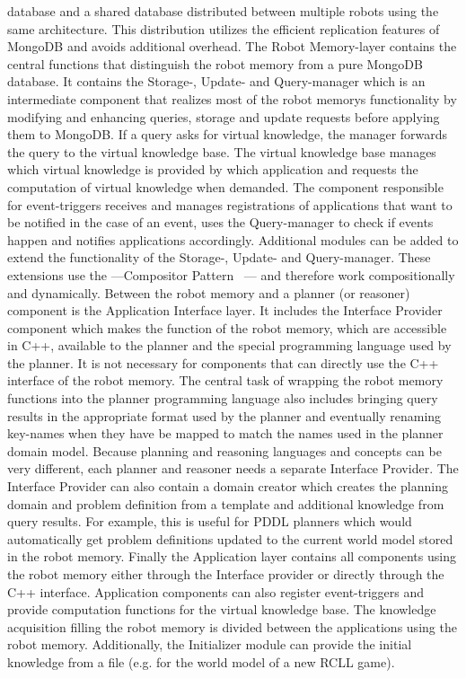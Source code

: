 \documentclass[a4paper,11pt]{article}
\begin{document}
database and a shared database distributed between multiple robots
using the same architecture. This distribution utilizes the efficient
replication features of MongoDB and avoids additional overhead. The
Robot Memory-layer contains the central functions that distinguish the
robot memory from a pure MongoDB database. It contains the Storage-,
Update- and Query-manager which is an intermediate component that
realizes most of the robot memorys functionality by modifying and
enhancing queries, storage and update requests before applying them to
MongoDB. If a query asks for virtual knowledge, the manager forwards
the query to the virtual knowledge base. The virtual knowledge base
manages which virtual knowledge is provided by which application and
requests the computation of virtual knowledge when demanded. The
component responsible for event-triggers receives and manages
registrations of applications that want to be notified in the case of
an event, uses the Query-manager to check if events happen and notifies
applications accordingly. Additional modules can be added to extend
the functionality of the Storage-, Update- and Query-manager. These
extensions use the ---Compositor
Pattern~\cite{design-patterns} --- and therefore work
compositionally and dynamically. Between the robot memory and a
planner (or reasoner) component is the Application Interface layer. It
includes the Interface Provider component which makes the function of
the robot memory, which are accessible in C++, available to the
planner and the special programming language used by the planner. It
is not necessary for components that can directly use the C++
interface of the robot memory. The central task of wrapping the robot
memory functions into the planner programming language also includes
bringing query results in the appropriate format used by the planner
and eventually renaming key-names when they have be mapped to match
the names used in the planner domain model. Because planning and
reasoning languages and concepts can be very different, each planner
and reasoner needs a separate Interface Provider. The Interface
Provider can also contain a domain creator which creates the planning
domain and problem definition from a template and additional knowledge
from query results. For example, this is useful for PDDL planners
which would automatically get problem definitions updated to the
current world model stored in the robot memory. Finally the Application
layer contains all components using the robot memory either through
the Interface provider or directly through the C++
interface. Application components can also register event-triggers and
provide computation functions for the virtual knowledge base.  The
knowledge acquisition filling the robot memory is divided between the
applications using the robot memory. Additionally, the Initializer
module can provide the initial knowledge from a file (e.g. for the
world model of a new RCLL game).
\end{document}
